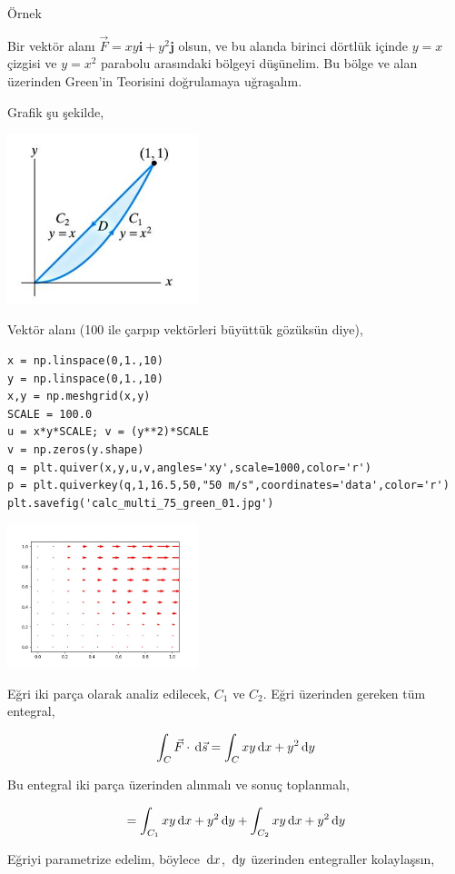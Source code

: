 \documentclass[12pt,fleqn]{article}\usepackage{../../common}
\begin{document}
Örnek

Bir vektör alanı $\vec{F} = xy \textbf{i} + y^2 \textbf{j}$ olsun, ve bu
alanda birinci dörtlük içinde $y = x$ çizgisi ve $y=x^2$ parabolu arasındaki
bölgeyi düşünelim. Bu bölge ve alan üzerinden Green'in Teorisini doğrulamaya
uğraşalım.

Grafik şu şekilde,

\includegraphics[width=15em]{calc_multi_75_green_02.jpg}

Vektör alanı (100 ile çarpıp vektörleri büyüttük gözüksün diye),

\begin{verbatim}
x = np.linspace(0,1.,10)
y = np.linspace(0,1.,10)
x,y = np.meshgrid(x,y)
SCALE = 100.0
u = x*y*SCALE; v = (y**2)*SCALE
v = np.zeros(y.shape)
q = plt.quiver(x,y,u,v,angles='xy',scale=1000,color='r')
p = plt.quiverkey(q,1,16.5,50,"50 m/s",coordinates='data',color='r')
plt.savefig('calc_multi_75_green_01.jpg')
\end{verbatim}

\includegraphics[width=15em]{calc_multi_75_green_01.jpg}

Eğri iki parça olarak analiz edilecek, $C_1$ ve $C_2$.  Eğri üzerinden gereken
tüm entegral,

$$
\int_C \vec{F} \cdot \,\mathrm{d}{\vec{s}} = \int_C xy \,\mathrm{d} x + y^2 \,\mathrm{d} y
$$

Bu entegral iki parça üzerinden alınmalı ve sonuç toplanmalı,

$$
= \int_{C_1} xy \,\mathrm{d} x + y^2 \,\mathrm{d} y + \int_{C_2} xy \,\mathrm{d} x + y^2 \,\mathrm{d} y
\label{2}
$$

Eğriyi parametrize edelim, böylece $\,\mathrm{d} x$, $\,\mathrm{d} y$ üzerinden entegraller
kolaylaşsın,
\end{document}
